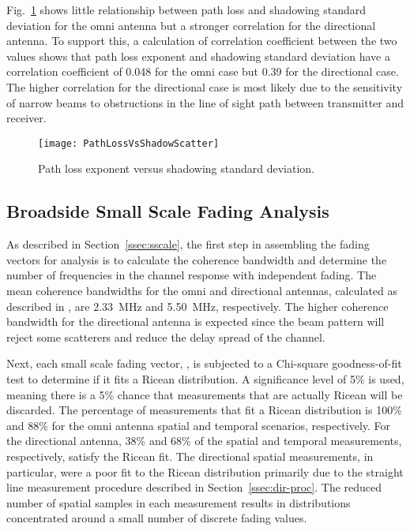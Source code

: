 \documentclass[12pt]{IEEEtran}
\begin{document}
Fig.~\ref{fg.nAndShdwCorr} shows little relationship between path loss and shadowing standard deviation for the omni antenna but a stronger correlation for the directional antenna.  To support this, a calculation of correlation coefficient between the two values shows that path loss exponent and shadowing standard deviation have a correlation coefficient of 0.048 for the omni case but 0.39 for the directional case.  The higher correlation for the directional case is most likely due to the sensitivity of narrow beams to obstructions in the line of sight path between transmitter and receiver.



\begin{figure}[htbp]
  \centerline{\texttt{[image: PathLossVsShadowScatter]}}
  \caption{Path loss exponent versus shadowing standard deviation.}
  \label{fg.nAndShdwCorr}
\end{figure}





\subsection{Broadside Small Scale Fading Analysis}
\label{ssec:ssanalysis}

As described in Section~\ref{ssec:sscale}, the first step in assembling the fading vectors for analysis is to calculate the coherence bandwidth and determine the number of frequencies in the channel response with independent fading.  The mean coherence bandwidths for the omni and directional antennas, calculated as described in \cite{rappaport_ts1}, are 2.33~MHz and 5.50~MHz, respectively.  The higher coherence bandwidth for the directional antenna is expected since the beam pattern will reject some scatterers and reduce the delay spread of the channel. 

Next, each small scale fading vector, , is subjected to a Chi-square goodness-of-fit test \cite{navidi_wc1} to determine if it fits a Ricean distribution.  A significance level of 5\% is used, meaning there is a 5\% chance that measurements that are actually Ricean will be discarded.  The percentage of measurements that fit a Ricean distribution is 100\% and 88\% for the omni antenna spatial and temporal scenarios, respectively.  For the directional antenna, 38\% and 68\% of the spatial and temporal measurements, respectively, satisfy the Ricean fit.  The directional spatial measurements, in particular, were a poor fit to the Ricean distribution primarily due to the straight line measurement procedure described in Section~\ref{ssec:dir-proc}.  The reduced number of spatial samples in each measurement results in distributions concentrated around a small number of discrete fading values.
\end{document}
